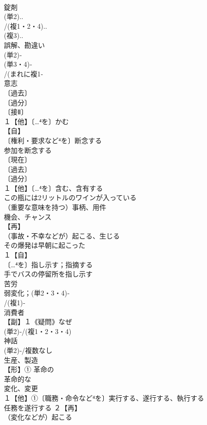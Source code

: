 \documentclass[8pt]{extreport}
\begin{document}
\begin{CJK}{UTF8}{min}
\\	錠剤 
\\	(単2)..
\\	/(複1・2・4)..
\\	(複3)..
\\	誤解、勘違い
\\	(単2)‐
\\	(単3・4)‐
\\	/(まれに複1‐
\\	意志 
\\	〔過去〕
\\	〔過分〕
\\	〔接Ⅱ〕
\\	１【他】〔…⁴を〕かむ 
\\	【自】
\\	〔権利・要求など⁴を〕断念する 
\\	参加を断念する
\\	〔現在〕
\\	〔過去〕
\\	〔過分〕
\\	１【他】〔…⁴を〕含む、含有する 
\\	この瓶には2リットルのワインが入っている
\\	（重要な意味を持つ）事柄、用件 
\\	機会、チャンス
\\	【再】
\\	（事故・不幸などが）起こる、生じる 
\\	その爆発は早朝に起こった 
\\	１【自】
\\	〔…⁴を〕指し示す；指摘する 
\\	手でバスの停留所を指し示す
\\	苦労 
\\	弱変化；(単2・3・4)‐
\\	/(複1)‐
\\	消費者 
\\	【副】１《疑問》なぜ 
\\	(単2)‐/(複1・2・3・4)
\\	神話 
\\	(単2)‐/複数なし　
\\	生産、製造 
\\	【形】① 革命の 
\\	革命的な
\\	変化、変更 
\\	１【他】①〔職務・命令など⁴を〕実行する、遂行する、執行する 
\\	任務を遂行する ２【再】
\\	（変化などが）起こる

\end{CJK}
\end{document}
